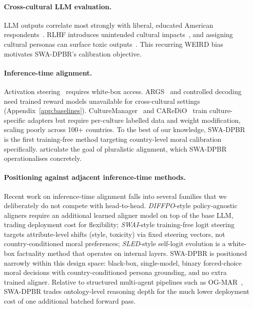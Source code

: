 \documentclass{article}
\begin{document}
\paragraph{Cross-cultural LLM evaluation.}
LLM outputs correlate most strongly with liberal, educated American
respondents~\citep{santurkar2023opinions}. RLHF introduces unintended cultural
impacts~\citep{ryan2024unintended}, and assigning cultural personas can surface
toxic outputs~\citep{deshpande2023toxicity}. This recurring WEIRD bias motivates
SWA-DPBR's calibration objective.

\paragraph{Inference-time alignment.}
Activation steering~\citep{arditi2025refusal, zou2023representation} requires
white-box access. ARGS~\citep{khanov2024args} and controlled
decoding~\citep{mudgal2024controlled} need trained reward models unavailable for
cross-cultural settings (Appendix~\ref{app:baselines}).
CultureManager~\citep{li2024culturemanager} and CAReDiO~\citep{yao2024caredio}
train culture-specific adapters but require per-culture labelled data and weight
modification, scaling poorly across 100+ countries. To the best of our knowledge,
SWA-DPBR is the first training-free method targeting country-level moral
calibration specifically.
\citet{sorensen2024roadmap} articulate the goal of pluralistic alignment, which
SWA-DPBR operationalises concretely.

\paragraph{Positioning against adjacent inference-time methods.}
Recent work on inference-time alignment falls into several families that we
deliberately do not compete with head-to-head. \emph{DIFFPO}-style
policy-agnostic aligners require an additional learned aligner model on top
of the base LLM, trading deployment cost for flexibility; \emph{SWAI}-style
training-free logit steering targets attribute-level shifts (style,
toxicity) via fixed steering vectors, not country-conditioned moral
preferences; \emph{SLED}-style self-logit evolution is a white-box
factuality method that operates on internal layers. SWA-DPBR is positioned
narrowly within this design space: black-box, single-model, binary
forced-choice moral decisions with country-conditioned persona grounding,
and no extra trained aligner. Relative to structured multi-agent pipelines
such as OG-MAR~\citep{ogmar2024}, SWA-DPBR trades ontology-level reasoning
depth for the much lower deployment cost of one additional batched forward
pass.
\end{document}
